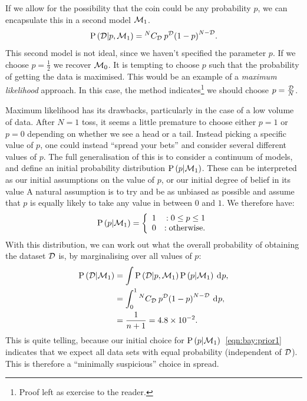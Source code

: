 If we allow for the possibility that the coin could be any probability $p$, we can encapsulate this in a second model $\mathcal{M}_1$.
\begin{equation}
  \mathrm{P}\left(\mathcal{D}\middle|p,\mathcal{M}_1\right)= {^{N}C_{\mathcal{D}}}\: {p}^{\mathcal{D}} {\left(1 - p \right)}^{N-\mathcal{D}}.
  \label{eqn:bay:M1}
\end{equation}
This second model is not ideal, since we haven't specified the parameter $p$. If we choose $p=\frac{1}{2}$ we recover $\mathcal{M}_0$. It is tempting to choose $p$ such that the probability of getting the data is maximised. This would be an example of a {\em maximum likelihood\/} approach. In this case, the method indicates\footnote{Proof left as exercise to the reader.} we should choose $p = \frac{\mathcal{D}}{N}$. 

Maximum likelihood has its drawbacks, particularly in the case of a low volume of data. After $N=1$ toss, it seems a little premature to choose either $p=1$ or $p=0$ depending on whether we see a head or a tail. Instead picking a specific value of $p$, one could instead ``spread your bets'' and consider several different values of $p$. The full generalisation of this is to consider a continuum of models, and define an initial probability distribution $\mathrm{P}\left(p\middle|\mathcal{M}_1\right)$. These can be interpreted as our initial assumptions on the value of $p$, or our initial degree of belief in its value
A natural assumption is to try and be as unbiased as possible and assume that $p$ is equally likely to take any value in between $0$ and $1$. We therefore have:
\begin{equation}
  \mathrm{P}\left(p\middle|\mathcal{M}_1\right)=\left\{
  \begin{array}{lr}
    1 &:0\le p\le1\\
    0 &:\text{otherwise.}\\
  \end{array}
  \right.\label{eqn:bay:prior1}
\end{equation}
With this distribution, we can work out what the overall probability of obtaining the dataset $\mathcal{D}$ is, by marginalising over all values of $p$:
\begin{align}
  \mathrm{P}\left(\mathcal{D}\middle|\mathcal{M}_1\right) 
  &= \int \mathrm{P}\left(\mathcal{D}\middle|p,\mathcal{M}_1\right)\mathrm{P}\left(p\middle|\mathcal{M}_1\right)\: \operatorname{d}^{}\!{p}, \\
  &= \int_0^1 {^{N}C_{\mathcal{D}}}\: {p}^{\mathcal{D}} {\left(1 - p \right)}^{N-\mathcal{D}}\: \operatorname{d}^{}\!{p}, \\
  &= \frac{1}{n+1} = 4.8\times10^{-2}.
  \label{eqn:bay:marg}
\end{align}
This is quite telling, because our initial choice for $\mathrm{P}\left(p\middle|\mathcal{M}_1\right)$~\ref{eqn:bay:prior1} indicates that we expect all data sets with equal probability (independent of $\mathcal{D}$). This is therefore a ``minimally suspicious'' choice in spread.

